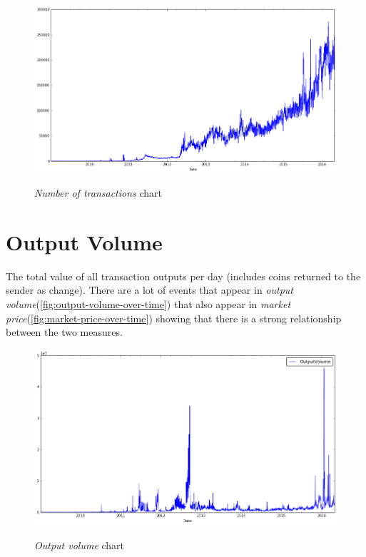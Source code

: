 \begin{figure}[bth]
  \myfloatalign
  {\includegraphics[width=1\linewidth]
    {gfx/n-transactions-over-time}}
  \caption{\textit{Number of transactions} chart}
  \label{fig:n-transactions-over-time}
\end{figure}


\section{Output Volume}
\label{sec:output-volume}

The total value of all transaction outputs per day (includes coins
returned to the sender as change). There are a lot of events that
appear in \textit{output
volume}(\autoref{fig:output-volume-over-time}) that also appear in
\textit{market price}(\autoref{fig:market-price-over-time}) showing
that there is a strong relationship between the two measures.

\begin{figure}[bth]
  \myfloatalign
  {\includegraphics[width=1\linewidth]
    {gfx/output-volume-over-time}}
  \caption{\textit{Output volume} chart}
  \label{fig:output-volume-over-time}
\end{figure}

